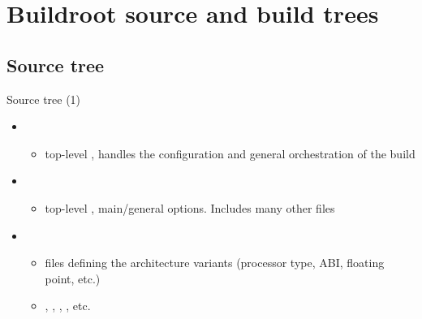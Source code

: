 \section{Buildroot source and build trees}

\subsection{Source tree}

\begin{frame}{Source tree (1)}
  \begin{itemize}
  \item {}
    \begin{itemize}
    \item top-level , handles the configuration and
      general orchestration of the build
    \end{itemize}
  \item {}
    \begin{itemize}
    \item top-level , main/general options. Includes
      many other  files
    \end{itemize}
  \item {}
    \begin{itemize}
    \item {} files defining the architecture
      variants (processor type, ABI, floating point, etc.)
    \item {}, ,
      , , etc.
    \end{itemize}
  \end{itemize}
\end{frame}

